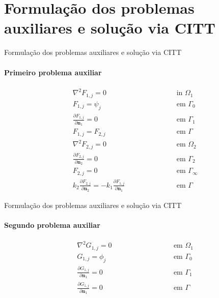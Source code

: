 \documentclass{beamer}
\begin{document}
\section{Formulação dos problemas auxiliares e solução via CITT}
\begin{frame}{Formulação dos problemas auxiliares e solução via CITT}
	\framesubtitle{Primeiro problema auxiliar}
	\begin{subequations}
		\begin{alignat*}{2}
		& \nabla^2 F_{1,j} = 0 \quad\quad\quad\quad\quad && \text{ in } \Omega_1  \\
		& F_{1,j} = \psi_j && \text{ em } \Gamma_0   \\
		& \frac{\partial F_{1,j}}{\partial \mathbf{n}_1} = 0 && \text{ em }  \Gamma_1  \\ 
		& F_{1,j} = F_{2, j} \quad\quad\quad\quad\quad\quad\quad\quad && \text{ em }  \Gamma \\
		& \nabla^2 F_{2,j} = 0 && \text{ em }  \Omega_2 \\
		& \frac{\partial F_{2,j}}{\partial \mathbf{n}_2} = 0 && \text{ em }  \Gamma_2 \\
		& F_{2,j} = 0 && \text{ em }  \Gamma_\infty \\
		& k_2\frac{\partial F_{2, j}}{\partial\mathbf{n}_2} = - k_1\frac{\partial F_{1,j}}{\partial\mathbf{n}_1} && \text{ em }  \Gamma 
		\end{alignat*}
	\end{subequations}

	\begin{center}
	\end{center}
\end{frame}

\begin{frame}{Formulação dos problemas auxiliares e solução via CITT}
	\framesubtitle{Segundo problema auxiliar}
	\begin{subequations}
		\begin{alignat*}{2}
		& \nabla^2 G_{1,j} = 0 \quad\quad\quad\quad\quad && \text{ em } \Omega_1  \\ 
		& G_{1,j} = \phi_j && \text{ em } \Gamma_0  \\
		& \frac{\partial G_{1,j}}{\partial \mathbf{n}_1} = 0 && \text{ em }  \Gamma_1  \\ 
		& \frac{\partial G_{1,j}}{\partial\mathbf{n}_1} = 0 \quad\quad\quad\quad\quad\quad\quad\quad && \text{ em }  \Gamma 
		\end{alignat*}
	\end{subequations}

	\begin{center}
	\end{center}
\end{frame}
\end{document}
